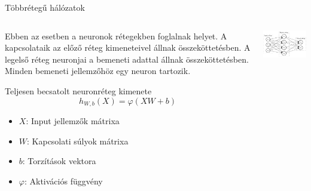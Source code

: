 \documentclass[english, aspectratio=169]{beamer}
\begin{document}
\begin{frame}{Többrétegű hálózatok}
	\begin{columns}
		\begin{column}{.5\textwidth}
			Ebben az esetben a neuronok rétegekben foglalnak helyet. A kapcsolataik az előző réteg kimeneteivel állnak összeköttetésben. A legelső réteg neuronjai a bemeneti adattal állnak összeköttetésben. Minden bemeneti jellemzőhöz egy neuron tartozik.\par\smallskip
			\begin{block}{Teljesen becsatolt neuronréteg kimenete}
				\[
				h_{W,b}(X)=\varphi(XW+b)
				\]
				\vspace{-0.5cm}
				\begin{itemize}
					\item $X$: Input jellemzők mátrixa
					\item $W$: Kapcsolati súlyok mátrixa
					\item $b$: Torzítások vektora
					\item $\varphi$: Aktivációs függvény
				\end{itemize}
			\end{block}
		\end{column}
		\begin{column}{.5\textwidth}
			\begin{center}
				\includegraphics[width=7cm, keepaspectratio]{graphs/dl_0.png}
			\end{center}
		\end{column}
	\end{columns}
\end{frame}
\end{document}
